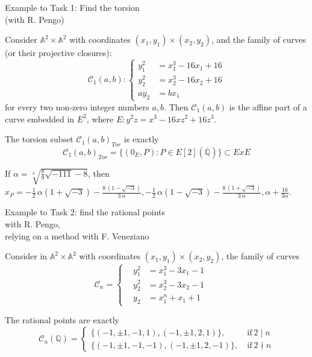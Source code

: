 \documentclass[handout]{beamer}
\newcommand{\Ci}{\mathcal{C}}
\begin{document}
\begin{frame}{Example to Task 1: Find the torsion \\ (with R. Pengo)}
\begin{example} Consider $\mathbb{A}^2\times\mathbb{A}^2$ with coordinates  $(x_1,y_1)\times (x_2,y_2)$, and the family of curves (or their projective closures):
\[
	\mathcal{C}_1(a,b) \colon \begin{cases}
		
		y_1^2 &= x_1^3 -16 x_1 + 16 \\
		y_2^2 &= x_2^3 -16 x_2 + 16\\
		a y_2 &= b x_1 	\end{cases}
\]
for every two non-zero integer numbers $a,b$. Then $\mathcal{C}_1(a,b)$ is the affine part of a curve embedded in $E^2$, where $E \colon y^2 z = x^3 - 16 x z^2 + 16 z^3$. 

\pause

\begin{alertblock}
{The torsion subset $\mathcal{C}_1(a,b)_{Tor}$ is exactly}
\[
\Ci_1(a,b)_{Tor}=\{(0_E,P) : P \in E[2](\overline{\mathbb{Q}})\}\subset ExE
\]
\end{alertblock}
\vspace{0.2cm}
If $\alpha = \sqrt[3]{\frac{8}{9} \sqrt{-111} - 8}$, then $x_P=-\frac{1}{2} \, \alpha {\left(1 + \sqrt{-3}\right)} - \frac{8 \, {\left(1 - \sqrt{-3}\right)}}{3 \, \alpha}, -\frac{1}{2} \, \alpha {\left(1 - \sqrt{-3}\right)} - \frac{8 \, {\left(1 + \sqrt{-3}\right)}}{3 \, \alpha}, \alpha + \frac{16}{3 \alpha}$.
\end{example}
\end{frame}



\begin{frame}{Example to Task 2: find the rational points\\
with R. Pengo, \\ relying on a method with F. Veneziano}
\begin{example}

Consider in $\mathbb{A}^2\times\mathbb{A}^2$ with coordinates  $(x_1,y_1)\times (x_2,y_2)$, the family of curves
\begin{equation*}
\mathcal{C}_n=\begin{cases}
\,\,\,\,\,y_1^2&=x_1^3-3x_1-1\,\,\,\,\,\,\,\,\\
\,\,\,\,\,y_2^2&=x_2^3-3x_2-1\,\,\,\,\,\,\,\,\\
\,\,\,\,\,y_2&=x_1^n+x_1+1
\end{cases}
\end{equation*}
\pause
\begin{alertblock}
{The rational points are exactly} \[
		\mathcal{C}_{n}(\mathbb{Q}) = \begin{cases}
			\{(-1,\pm 1,-1,1),(-1,\pm 1,2,1)\}, \ &\text{if}  \ 2 \mid n \\
			\{(-1,\pm 1,-1,-1),(-1,\pm 1,2,-1)\}, \ &\text{if} \ 2 \nmid n 
		\end{cases}
	\]

\end{alertblock}
\end{example}
\end{frame}
\end{document}
